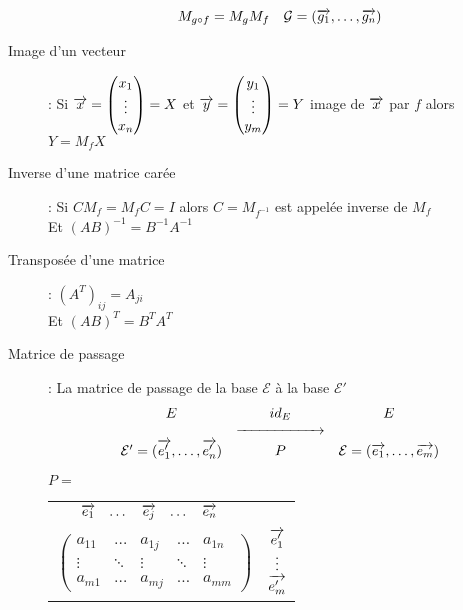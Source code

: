 \begin{description}
\[\begin{matrix}
        M_{g\circ f}=M_gM_f &
        \mathcal{G}=(\overrightarrow{g_1},\dots,\overrightarrow{g_n})
    \end{matrix}\]
\item[Image d'un vecteur] : Si $\overrightarrow{x}=\begin{pmatrix}x_1\\\vdots\\ x_n\end{pmatrix}=X$ et $\overrightarrow{y}=\begin{pmatrix}y_1\\\vdots\\ y_m\end{pmatrix}=Y$ image de $\overrightarrow{x}$ par $f$
    alors $Y=M_fX$
\item[Inverse d'une matrice carée] : Si $CM_f=M_fC=I$ alors $C=M_{f^{-1}}$ est appelée inverse de $M_f$\\
    Et $(AB)^{-1}=B^{-1}A^{-1}$
\item[Transposée d'une matrice] : $(A^T)_{ij}=A_{ji}$\\
    Et $(AB)^T=B^TA^T$
\item[Matrice de passage] : La matrice de passage de la base $\mathcal E$ à la base $\mathcal{ E'}$
    \[\begin{matrix}
        E & id_E & E\\
        & \xrightarrow{\makebox[2cm]{}} &\\
        \mathcal{E}'=(\vect{e'_1},\dots,\vect{e'_n}) & P &
        \mathcal{E}=(\vect{e_1},\dots,\vect{e_m})\\
    \end{matrix}\]
    \begin{center}
        $P=$
        \begin{tabular}[h!]{cc}
            $\makebox[-0.25cm]{}
            \begin{matrix}
                \vect{e_1} & \dots & \vect{e_j} & \dots & \vect{e_n}
            \end{matrix}$ \\
            $\left(\begin{matrix}
                a_{11} & \dots & a_{1j} & \dots & a_{1n} \\
                \vdots & \ddots & \vdots & \ddots & \vdots \\
                a_{m1} & \dots & a_{mj} & \dots & a_{mm}
            \end{matrix}\right)$ &
            $\begin{matrix}\overrightarrow{e'_1}\\\vdots\\\overrightarrow{e'_m}\end{matrix}$

\end{tabular}
\end{center}
\end{description}
